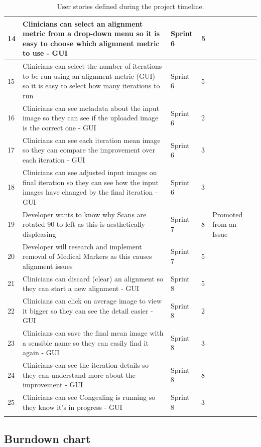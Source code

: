 \begin{center}
\begin{longtable}{| p{2cm} | p{4cm} | p{2cm}  | p{2cm} | p{3cm} |}
      14 & Clinicians can select an alignment metric from a drop-down menu so it is easy to choose which alignment metric to use - \acrshort{GUI} & Sprint 6 & 5 & \\ \hline
      15 & Clinicians can select the number of iterations to be run using an alignment metric (GUI) so it is easy to select how many iterations to run & Sprint 6 & 5 & \\ \hline
      16 & Clinicians can see metadata about the input image so they can see if the uploaded image is the correct one - \acrshort{GUI} & Sprint 6 & 2 & \\ \hline
      17 & Clinicians can see each iteration mean image so they can compare the improvement over each iteration - \acrshort{GUI} & Sprint 6 & 3 & \\ \hline
      18 & Clinicians can see adjusted input images on final iteration so they can see how the input images have changed by the final iteration - \acrshort{GUI} & Sprint 6 & 3 & \\ \hline
      19 & Developer wants to know why Scans are rotated 90 to left as this is aesthetically displeasing & Sprint 7 & 8 & Promoted from an Issue \\ \hline
      20 & Developer will research and implement removal of Medical Markers as this causes alignment issues & Sprint 7 & 5 & \\ \hline
      21 & Clinicians can discard (clear) an alignment so they can start a new alignment - \acrshort{GUI} & Sprint 8 & 5 & \\ \hline
      22 & Clinicians can click on average image to view it bigger so they can see the detail easier - \acrshort{GUI} & Sprint 8 & 2 & \\ \hline
      23 & Clinicians can save the final mean image with a sensible name so they can easily find it again - \acrshort{GUI} & Sprint 8 & 3 & \\ \hline
      24 & Clinicians can see the iteration details so they can understand more about the improvement - \acrshort{GUI} & Sprint 8 & 8 & \\ \hline
      25 & Clinicians can see \Gls{Congealing} is running so they know it's in progress - \acrshort{GUI} & Sprint 8 & 3 & \\ \hline
  \caption{User stories defined during the project timeline.}
  \label{table:User Stories}
\end{longtable}
\end{center}

\subsection{Burndown chart}

